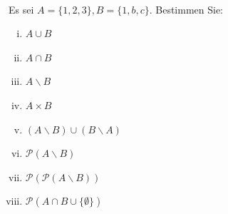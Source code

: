 \newcommand{\printpraesenzlsg}{false}
\newcommand{\printloesungen}{false}
\newcommand{\printbewertungen}{false}
\newcommand{\blattnummer}{4}



\iforiginal{}

	

\\
Es sei $A=\{1,2,3\}, B=\{1,b,c\}$. Bestimmen Sie:
\begin{enumerate}[(i)]
\item $A\cup B$
\item $A\cap B$
\item $A\backslash B$
\item $A\times B$
\item $(A\backslash B)\cup (B\backslash A)$
\item $\mathscr{P}(A\backslash B)$
\item $\mathscr{P}(\mathscr{P}(A\backslash B))$
\item $\mathscr{P}(A\cap B\cup\{\emptyset\})$

\end{enumerate}

